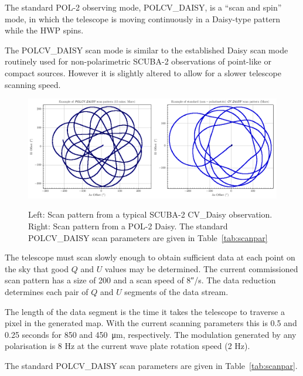 The standard POL-2 observing mode, POLCV\_DAISY, is a “scan and spin” mode,
in which the telescope is moving continuously in a Daisy-type pattern while the
HWP spins.

The POLCV\_DAISY scan mode is similar to the established Daisy scan mode
routinely used for non-polarimetric SCUBA-2 observations of point-like or compact
sources. However it is slightly altered to allow for a slower telescope scanning
speed.


\begin{figure}[t!]
\begin{center}
\includegraphics[width=0.9\linewidth]{scan_pattern_daisy_comparison.png}
\label{fig:scancompsrison}
\caption [Scan Pattern Comparison]{Left: Scan pattern from a typical SCUBA-2 CV_Daisy 
observation. Right: Scan pattern from a POL-2 Daisy. The standard POLCV\_DAISY scan 
parameters are given in Table~\ref{tab:scanpar}
  \small
}
\end{center}
\end{figure}




The telescope must scan slowly enough to obtain sufficient data at each 
point on the sky that good $Q$ and $U$ values may be determined. The current 
commissioned scan pattern has a size of 200\arcs{} and a scan speed of 
8\si{\arcsecond}/s. The data reduction determines each pair of $Q$ and $U$ 
segments of the data stream. 


The length of the data segment is the time it takes the telescope to traverse
a pixel in the generated map. With the current scanning parameters this is 0.5 and 
0.25 seconds for 850 and \SI{450}{\micro\metre}, respectively. The modulation 
generated by any polarisation is 8 Hz at the current wave plate rotation speed 
(2 Hz). 

The standard POLCV\_DAISY scan parameters are given in Table~\ref{tab:scanpar}.

